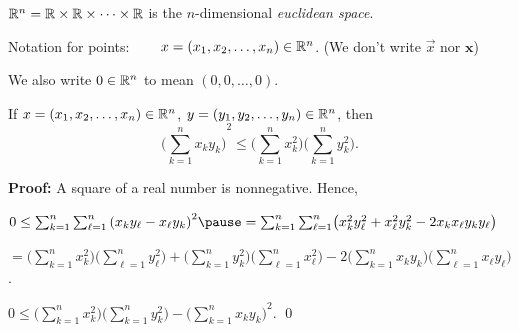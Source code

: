 \documentclass[10pt,aspectratio=169]{beamer}
\begin{document}
\begin{frame}
${\mathbb{R}}^n = {\mathbb{R}} \times {\mathbb{R}} \times \cdots \times {\mathbb{R}}$
is the
$n$-dimensional \emph{euclidean space}.

\pause
Notation for points: ~~~ $x =(x_1,x_2,\ldots,x_n) \in {\mathbb{R}}^n$.
\pause
\qquad (We don't write $\vec{x}$ nor $\mathbf{x}$)

\pause
We also write $0 \in {\mathbb{R}}^n$ to mean $(0,0,\ldots,0)$.

\pause

\begin{lemma}
If $x =(x_1,x_2,\ldots,x_n) \in {\mathbb{R}}^n$, $y =(y_1,y_2,\ldots,y_n) \in
{\mathbb{R}}^n$, then
\begin{equation*}
{\biggl( \sum_{k=1}^n x_k y_k \biggr)}^2
\leq
\biggl(\sum_{k=1}^n x_k^2 \biggr)
\biggl(\sum_{k=1}^n y_k^2 \biggr) .
\end{equation*}
\end{lemma}

\pause
\textbf{Proof:}
A square of a real number is nonnegative.
\pause
Hence,

\medskip

$
0
\leq 
\sum_{k=1}^n \sum_{\ell=1}^n {(x_k y_\ell - x_\ell y_k)}^2
\pause
=
\sum_{k=1}^n \sum_{\ell=1}^n
\bigl( x_k^2 y_\ell^2 + x_\ell^2 y_k^2 - 2 x_k x_\ell y_k y_\ell \bigr)
$

\pause
\medskip

\quad
$=
\biggl( \sum_{k=1}^n x_k^2 \biggr)
\biggl( \sum_{\ell=1}^n y_\ell^2 \biggr)
+
\biggl( \sum_{k=1}^n y_k^2 \biggr)
\biggl( \sum_{\ell=1}^n x_\ell^2 \biggr)
-
2
\biggl( \sum_{k=1}^n x_k y_k \biggr)
\biggl( \sum_{\ell=1}^n x_\ell y_\ell \biggr)$.

\pause
\medskip

\thus \quad 
$0 \leq 
\biggl( \sum_{k=1}^n x_k^2 \biggr)
\biggl( \sum_{k=1}^n y_k^2 \biggr)
-
{\biggl( \sum_{k=1}^n x_k y_k \biggr)}^2$.
\qed

\end{frame}
\end{document}

